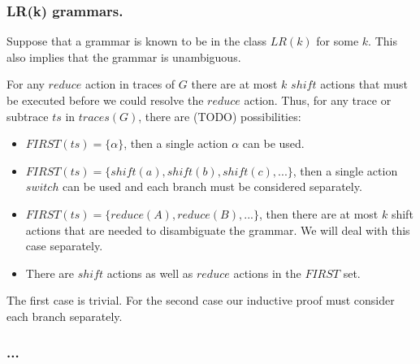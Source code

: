\documentclass[A4]{sig-alternate}
\begin{document}
\subsubsection{LR(k) grammars.}

Suppose that a grammar is known to be in the class $LR(k)$ for some $k$. This also implies that the grammar is unambiguous.

For any $reduce$ action in traces of $G$ there are at most $k$ $shi\!ft$ actions that must be executed before we could resolve the $reduce$ action.
Thus, for any trace or subtrace $ts$ in $traces(G)$, there are (TODO) possibilities:

\begin{itemize}
  \item $F\!I\!RST(ts) = \{ \alpha \}$, then a single action $\alpha$ can be used.
  \item $F\!I\!RST(ts) = \{ shift(a), shift(b), shift(c), ... \}$, then a single action $switch$ can be used and each branch must be considered separately.
  \item $F\!I\!RST(ts) = \{ reduce(A), reduce(B), ... \}$, then there are at most $k$ shift actions that are needed to disambiguate the grammar.
        We will deal with this case separately.
  \item There are $shift$ actions as well as $reduce$ actions in the $F\!I\!RST$ set.
\end{itemize}

The first case is trivial.
For the second case our inductive proof must consider each branch separately.

\subsubsection{...}
\end{document}
